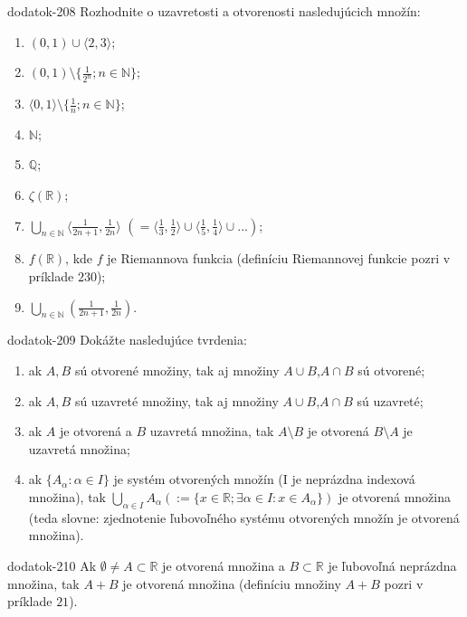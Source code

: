 \begin{defproblem}{dodatok-208}
Rozhodnite o uzavretosti a otvorenosti nasledujúcich množín:
\begin{multicols}{2}
\begin{enumerate}
    \item $(0,1) \cup \langle 2,3 \rangle$;
    \item $(0,1) \setminus \{\frac{1}{2^n}; n \in \mathbb{N}\}$;
    \item $\langle 0,1 \rangle \setminus \{\frac{1}{n}; n \in \mathbb{N}\}$;
    \item $\mathbb{N}$;
    \item $\mathbb{Q}$;
    \item $\zeta(\mathbb{R})$;
    \item $\bigcup_{n \in \mathbb{N}} \langle \frac{1}{2n+1},\frac{1}{2n} \rangle$  $(= \langle \frac{1}{3},\frac{1}{2} \rangle \cup \langle \frac{1}{5},\frac{1}{4} \rangle \cup ...)$;
    \item $f(\mathbb{R})$, kde $f$ je Riemannova funkcia (definíciu Riemannovej funkcie pozri v príklade $230$);
    \item $\bigcup_{n \in \mathbb{N}} (\frac{1}{2n+1},\frac{1}{2n})$.
\end{enumerate}
\end{multicols}
\end{defproblem}

\begin{defproblem}{dodatok-209}
Dokážte nasledujúce tvrdenia:
\begin{enumerate}
\item ak $A,B$ sú otvorené množiny, tak aj množiny $A \cup B$,$A \cap B$ sú otvorené;
\item ak $A,B$ sú uzavreté množiny, tak aj množiny $A \cup B$,$A \cap B$ sú uzavreté;
\item ak $A$ je otvorená a $B$ uzavretá množina, tak $A \setminus B$ je otvorená $B \setminus A$ je uzavretá množina;
\item ak $\{A_{\alpha}: \alpha \in I\}$ je systém otvorených množín (I je neprázdna indexová množina), tak $\bigcup_{\alpha \in I} A_\alpha (:=\{x \in \mathbb{R}; \exists \alpha \in I: x \in A_\alpha\})$ je otvorená množina (teda slovne: zjednotenie ľubovoľného systému otvorených množín je otvorená množina).
\end{enumerate}
\end{defproblem}

\begin{defproblem}{dodatok-210}
Ak $\emptyset \neq A \subset \mathbb{R}$ je otvorená množina a $B \subset \mathbb{R}$ je ľubovoľná neprázdna množina, tak $A+B$ je otvorená množina (definíciu množiny $A+B$ pozri v príklade $21$).
\end{defproblem}

